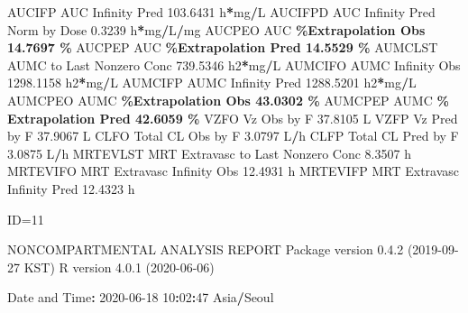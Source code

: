 \documentclass[
  10pt,
]{krantz}
\makeatletter
\newenvironment{Shaded}{\begin{snugshade}}{\end{snugshade}}
\newcommand{\DecValTok}[1]{\textcolor[rgb]{0.00,0.00,0.81}{#1}}
\newcommand{\FloatTok}[1]{\textcolor[rgb]{0.00,0.00,0.81}{#1}}
\newcommand{\NormalTok}[1]{#1}
\newcommand{\OperatorTok}[1]{\textcolor[rgb]{0.81,0.36,0.00}{\textbf{#1}}}
\newcommand{\StringTok}[1]{\textcolor[rgb]{0.31,0.60,0.02}{#1}}
\newenvironment{kframe}{%
\medskip{}
\setlength{\fboxsep}{.8em}
 \def\at@end@of@kframe{}%
 \ifinner\ifhmode%
  \def\at@end@of@kframe{\end{minipage}}%
  \begin{minipage}{\columnwidth}%
 \fi\fi%
 \def\FrameCommand##1{\hskip\@totalleftmargin \hskip-\fboxsep
 \colorbox{shadecolor}{##1}\hskip-\fboxsep
     \hskip-\linewidth \hskip-\@totalleftmargin \hskip\columnwidth}%
 \MakeFramed {\advance\hsize-\width
   \@totalleftmargin\z@ \linewidth\hsize
   \@setminipage}}%
 {\par\unskip\endMakeFramed%
 \at@end@of@kframe}
\renewenvironment{Shaded}{\begin{kframe}}{\end{kframe}}
\makeatother
\begin{document}
\begin{Shaded}
\begin{Highlighting}[]
\NormalTok{AUCIFP     AUC Infinity Pred                             }\FloatTok{103.6431}\NormalTok{ h}\OperatorTok{*}\NormalTok{mg}\OperatorTok{/}\NormalTok{L}
\NormalTok{AUCIFPD    AUC Infinity Pred Norm by Dose                  }\FloatTok{0.3239}\NormalTok{ h}\OperatorTok{*}\NormalTok{mg}\OperatorTok{/}\NormalTok{L}\OperatorTok{/}\NormalTok{mg}
\NormalTok{AUCPEO     AUC }\OperatorTok{\%Extrapolation Obs                         14.7697 \%}
\NormalTok{AUCPEP     AUC }\OperatorTok{\%Extrapolation Pred                        14.5529 \%}
\NormalTok{AUMCLST    AUMC to Last Nonzero Conc                     }\FloatTok{739.5346}\NormalTok{ h2}\OperatorTok{*}\NormalTok{mg}\OperatorTok{/}\NormalTok{L}
\NormalTok{AUMCIFO    AUMC Infinity Obs                            }\FloatTok{1298.1158}\NormalTok{ h2}\OperatorTok{*}\NormalTok{mg}\OperatorTok{/}\NormalTok{L}
\NormalTok{AUMCIFP    AUMC Infinity Pred                           }\FloatTok{1288.5201}\NormalTok{ h2}\OperatorTok{*}\NormalTok{mg}\OperatorTok{/}\NormalTok{L}
\NormalTok{AUMCPEO    AUMC }\OperatorTok{\%Extrapolation Obs                        43.0302 \%}
\NormalTok{AUMCPEP    AUMC }\OperatorTok{\% Extrapolation Pred                      42.6059 \%}
\NormalTok{VZFO       Vz Obs by F                                    }\FloatTok{37.8105}\NormalTok{ L}
\NormalTok{VZFP       Vz Pred by F                                   }\FloatTok{37.9067}\NormalTok{ L}
\NormalTok{CLFO       Total CL Obs by F                               }\FloatTok{3.0797}\NormalTok{ L}\OperatorTok{/}\NormalTok{h}
\NormalTok{CLFP       Total CL Pred by F                              }\FloatTok{3.0875}\NormalTok{ L}\OperatorTok{/}\NormalTok{h}
\NormalTok{MRTEVLST   MRT Extravasc to Last Nonzero Conc              }\FloatTok{8.3507}\NormalTok{ h}
\NormalTok{MRTEVIFO   MRT Extravasc Infinity Obs                     }\FloatTok{12.4931}\NormalTok{ h}
\NormalTok{MRTEVIFP   MRT Extravasc Infinity Pred                    }\FloatTok{12.4323}\NormalTok{ h}





\NormalTok{ID=}\DecValTok{11}

\NormalTok{                        NONCOMPARTMENTAL ANALYSIS REPORT}
\NormalTok{                       Package version }\DecValTok{0}\NormalTok{.}\FloatTok{4.2}\NormalTok{ (}\DecValTok{2019{-}09{-}27}\NormalTok{ KST)}
\NormalTok{                          R version }\DecValTok{4}\NormalTok{.}\FloatTok{0.1}\NormalTok{ (}\DecValTok{2020{-}06{-}06}\NormalTok{)}

\NormalTok{Date and Time}\OperatorTok{:}\StringTok{ }\DecValTok{2020{-}06{-}18} \DecValTok{10}\OperatorTok{:}\DecValTok{02}\OperatorTok{:}\DecValTok{47}\NormalTok{ Asia}\OperatorTok{/}\NormalTok{Seoul}


\end{Highlighting}
\end{Shaded}
\end{document}
